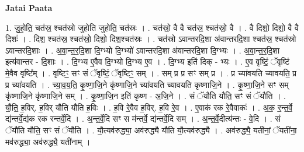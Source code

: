 \documentclass[17pt]{extarticle}
\begin{document}
\textbf{Jatai Paata} \newline

1. जु॒हो॒ति॒ चत॑स्र॒ श्चत॑स्रो जुहोति जुहोति॒ चत॑स्रः । . चत॑स्रो॒ वै वै चत॑स्र॒ श्चत॑स्रो॒ वै । . वै दिशो॒ दिशो॒ वै वै दिशः॑ । . दिश॒ श्चत॑स्र॒ श्चत॑स्रो॒ दिशो॒ दिश॒श्चत॑स्रः । . चत॑स्रो ऽवान्तरदि॒शा अ॑वान्तरदि॒शा श्चत॑स्र॒ श्चत॑स्रो ऽवान्तरदि॒शाः । . अ॒वा॒न्त॒र॒दि॒शा दि॒ग्भ्यो दि॒ग्भ्यो॑ ऽवान्तरदि॒शा अ॑वान्तरदि॒शा दि॒ग्भ्यः । . अ॒वा॒न्त॒र॒दि॒शा इत्य॑वान्तर - दि॒शाः । . दि॒ग्भ्य ए॒वैव दि॒ग्भ्यो दि॒ग्भ्य ए॒व । . दि॒ग्भ्य इति॑ दिक् - भ्यः । . ए॒व वृष्टिं॒ ॅवृष्टि॑ मे॒वैव वृष्टि᳚म् । . वृष्टिꣳ॒॒ सꣳ सं ॅवृष्टिं॒ ॅवृष्टिꣳ॒॒ सम् । . सम् प्र प्र सꣳ सम् प्र । . प्र च्या॑वयति च्यावयति॒ प्र प्र च्या॑वयति । . च्या॒व॒य॒ति॒ कृ॒ष्णा॒जि॒ने कृ॑ष्णाजि॒ने च्या॑वयति च्यावयति कृष्णाजि॒ने । . कृ॒ष्णा॒जि॒ने सꣳ सम् कृ॑ष्णाजि॒ने कृ॑ष्णाजि॒ने सम् । . कृ॒ष्णा॒जि॒न इति॑ कृष्ण - अ॒जि॒ने । . सं ॅयौ॑ति यौति॒ सꣳ सं ॅयौ॑ति । . यौ॒ति॒ ह॒विर्. ह॒विर् यौ॑ति यौति ह॒विः । . ह॒वि रे॒वैव ह॒विर्. ह॒वि रे॒व । . ए॒वाक॑ रक रे॒वैवाकः॑ । . अ॒क॒ र॒न्त॒र्वे॒ द्य॑न्तर्वे॒द्य॑क रक रन्तर्वे॒दि । . अ॒न्त॒र्वे॒दि सꣳ स म॑न्तर्वे॒ द्य॑न्तर्वे॒दि सम् । . अ॒न्त॒र्वे॒दीत्य॑न्तः - वे॒दि । . सं ॅयौ॑ति यौति॒ सꣳ सं ॅयौ॑ति । . यौ॒त्यव॑रुद्ध्या॒ अव॑रुद्ध्यै यौति यौ॒त्यव॑रुद्ध्यै । . अव॑रुद्ध्यै॒ यती॑नां॒ ॅयती॑ना॒ मव॑रुद्ध्या॒ अव॑रुद्ध्यै॒ यती॑नाम् । \newline
\end{document}
